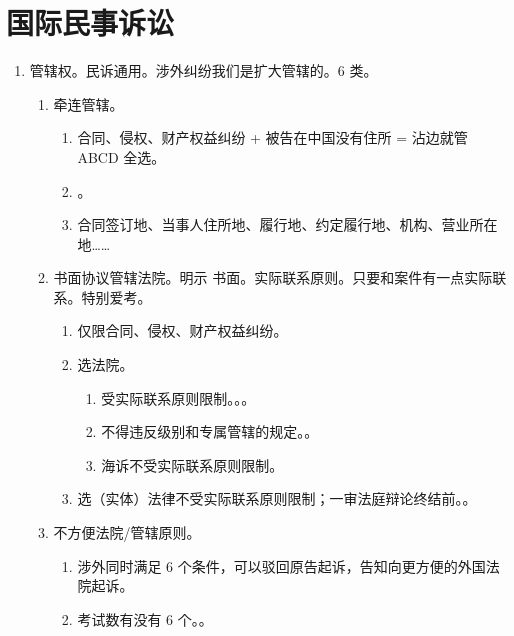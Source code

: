 \section{国际民事诉讼}
\begin{enumerate}
  \item 管辖权。民诉通用。涉外纠纷我们是扩大管辖的。6 类。
        \begin{enumerate}
          \item 牵连管辖。
                \begin{enumerate}
                  \item 合同、侵权、财产权益纠纷 + 被告在中国没有住所 = 沾边就管 \ydy ABCD 全选。
                  \item {}。
                  \item 合同签订地、当事人住所地、履行地、约定履行地、机构、营业所在地……
                \end{enumerate}
          \item 书面协议管辖法院。明示 \bdy 书面。实际联系原则。只要和案件有一点实际联系。特别爱考。
                \begin{enumerate}
                  \item 仅限合同、侵权、财产权益纠纷。
                  \item 选法院。
                        \begin{enumerate}
                          \item 受实际联系原则限制。。。
                          \item 不得违反级别和专属管辖的规定。。
                          \item 海诉不受实际联系原则限制。
                        \end{enumerate}
                  \item 选（实体）法律不受实际联系原则限制；一审法庭辩论终结前。。
                \end{enumerate}
          \item 不方便法院/管辖原则。
                \begin{enumerate}
                  \item 涉外同时满足 6 个条件，可以驳回原告起诉，告知向更方便的外国法院起诉。
                  \item 考试数有没有 6 个。。

\end{enumerate}
\end{enumerate}
\end{enumerate}
